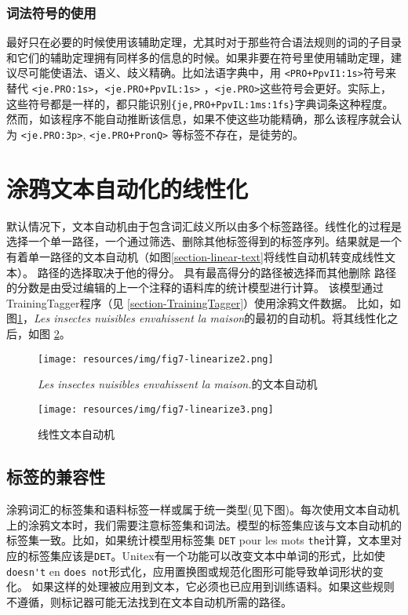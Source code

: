 \subsubsection{词法符号的使用}
\noindent 
最好只在必要的时候使用该辅助定理，尤其时对于那些符合语法规则的词的子目录和它们的辅助定理拥有同样多的信息的时候。如果非要在符号里使用辅助定理，建议尽可能使语法、语义、歧义精确。比如法语字典中，用 \verb$<PRO+PpvI1:1s>$符号来替代 \verb$<je.PRO:1s>$，\verb$<je.PRO+PpvIL:1s>$ ，\verb$<je.PRO>$这些符号会更好。实际上，这些符号都是一样的，都只能识别\verb${je,PRO+PpvIL:1ms:1fs}$字典词条这种程度。然而，如该程序不能自动推断该信息，如果不使这些功能精确，那么该程序就会认为 \verb$<je.PRO:3p>$, \verb$<je.PRO+PronQ>$ 等标签不存在，是徒劳的。


\section{涂鸦文本自动化的线性化}
\label{section-linearization}
默认情况下，文本自动机由于包含词汇歧义所以由多个标签路径。线性化的过程是选择一个单一路径，一个通过筛选、删除其他标签得到的标签序列。结果就是一个有着单一路径的文本自动机（如图\ref{section-linear-text}将线性自动机转变成线性文本）。
路径的选择取决于他的得分。
具有最高得分的路径被选择而其他删除
路径的分数是由受过编辑的上一个注释的语料库的统计模型进行计算。
该模型通过TrainingTagger程序（见 \ref{section-TrainingTagger}）使用涂鸦文件数据。
比如，如图\ref{fig7-linearize2}，\textit{Les insectes nuisibles envahissent la maison}的最初的自动机。将其线性化之后，如图 \ref{fig7-linearize3}。

\begin{figure}[!ht]
\begin{center}
\texttt{[image: resources/img/fig7-linearize2.png]}
\caption{\textit{Les insectes nuisibles envahissent la maison.}\label{fig7-linearize2}的文本自动机}
\end{center}
\end{figure}

\begin{figure}[!ht]
\begin{center}
\texttt{[image: resources/img/fig7-linearize3.png]}
\caption{线性文本自动机\label{fig7-linearize3}}
\end{center}
\end{figure}

\subsection{标签的兼容性}
\label{section-linearization-tagset}
涂鸦词汇的标签集和语料标签一样或属于统一类型(见下图)。每次使用文本自动机上的涂鸦文本时，我们需要注意标签集和词法。模型的标签集应该与文本自动机的标签集一致。比如，如果统计模型用标签集 \verb+DET+ pour les mots \verb+the+计算，文本里对应的标签集应该是\verb+DET+。Unitex有一个功能可以改变文本中单词的形式，比如使 \verb+doesn't+ en \verb+does not+形式化，应用置换图或规范化图形可能导致单词形状的变化。
如果这样的处理被应用到文本，它必须也已应用到训练语料。如果这些规则不遵循，则标记器可能无法找到在文本自动机所需的路径。

